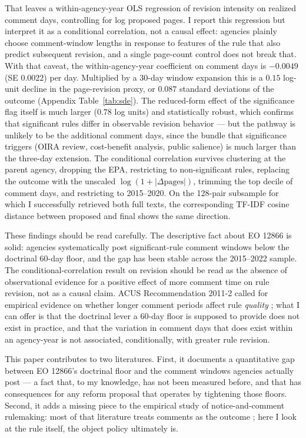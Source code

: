 \documentclass[12pt]{article}
\begin{document}
That leaves a within-agency-year OLS regression of revision intensity on realized comment days, controlling for log proposed pages. I report this regression but interpret it as a conditional correlation, not a causal effect: agencies plainly choose comment-window lengths in response to features of the rule that also predict subsequent revision, and a single page-count control does not break that. With that caveat, the within-agency-year coefficient on comment days is $-0.0049$ (SE $0.0022$) per day. Multiplied by a 30-day window expansion this is a $0.15$ log-unit decline in the page-revision proxy, or $0.087$ standard deviations of the outcome (Appendix Table~\ref{tab:sde}). The reduced-form effect of the significance flag itself is much larger ($0.78$ log units) and statistically robust, which confirms that significant rules differ in observable revision behavior --- but the pathway is unlikely to be the additional comment days, since the bundle that significance triggers (OIRA review, cost-benefit analysis, public salience) is much larger than the three-day extension. The conditional correlation survives clustering at the parent agency, dropping the EPA, restricting to non-significant rules, replacing the outcome with the unscaled $\log(1+|\Delta\text{pages}|)$, trimming the top decile of comment days, and restricting to 2015--2020. On the 128-pair subsample for which I successfully retrieved both full texts, the corresponding TF-IDF cosine distance between proposed and final shows the same direction.

These findings should be read carefully. The descriptive fact about EO 12866 is solid: agencies systematically post significant-rule comment windows below the doctrinal 60-day floor, and the gap has been stable across the 2015--2022 sample. The conditional-correlation result on revision should be read as the absence of observational evidence for a positive effect of more comment time on rule revision, not as a causal claim. ACUS Recommendation 2011-2 called for empirical evidence on whether longer comment periods affect rule \emph{quality} \citep{acus2011comment}; what I can offer is that the doctrinal lever a 60-day floor is supposed to provide does not exist in practice, and that the variation in comment days that does exist within an agency-year is not associated, conditionally, with greater rule revision.

This paper contributes to two literatures. First, it documents a quantitative gap between EO 12866's doctrinal floor and the comment windows agencies actually post --- a fact that, to my knowledge, has not been measured before, and that has consequences for any reform proposal that operates by tightening those floors. Second, it adds a missing piece to the empirical study of notice-and-comment rulemaking: most of that literature treats comments as the outcome \citep{yackee2006sweet,yackee2015role,balla2019can}; here I look at the rule itself, the object policy ultimately is.
\end{document}
